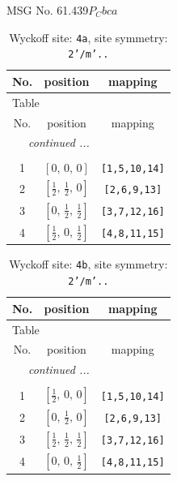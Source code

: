 \documentclass[fleqn,8pt]{jsarticle}
\begin{document}
\setcounter{MaxMatrixCols}{32}

\renewcommand{\tablename}{Table~}
\renewcommand{\figurename}{Figure~}
\begin{center}
\LARGE
MSG No. 61.439\quad$P_{C}bca$
\end{center}
\renewcommand{\arraystretch}{1.2}
\begin{longtable}{ccc}
\caption{Wyckoff site: {\tt 4a}, site symmetry: {\tt 2'/m'..}}
 \\
 \hline \hline
No. & position & mapping \\ \hline \endfirsthead

\multicolumn{2}{l}{\tablename\ \thetable{}} \\
 \hline \hline
No. & position & mapping \\ \hline \endhead

 \hline \hline
\multicolumn{2}{r}{\footnotesize\it continued ...} \\ \endfoot

 \hline \hline
\multicolumn{2}{r}{} \\ \endlastfoot

1 & $\left[ 0,\, 0,\, 0 \right]$ & {\tt [1,5,10,14]} \\ \hline
2 & $\left[ \frac{1}{2},\, \frac{1}{2},\, 0 \right]$ & {\tt [2,6,9,13]} \\ \hline
3 & $\left[ 0,\, \frac{1}{2},\, \frac{1}{2} \right]$ & {\tt [3,7,12,16]} \\ \hline
4 & $\left[ \frac{1}{2},\, 0,\, \frac{1}{2} \right]$ & {\tt [4,8,11,15]} \\
\end{longtable}
\renewcommand{\arraystretch}{1.2}
\begin{longtable}{ccc}
\caption{Wyckoff site: {\tt 4b}, site symmetry: {\tt 2'/m'..}}
 \\
 \hline \hline
No. & position & mapping \\ \hline \endfirsthead

\multicolumn{2}{l}{\tablename\ \thetable{}} \\
 \hline \hline
No. & position & mapping \\ \hline \endhead

 \hline \hline
\multicolumn{2}{r}{\footnotesize\it continued ...} \\ \endfoot

 \hline \hline
\multicolumn{2}{r}{} \\ \endlastfoot

1 & $\left[ \frac{1}{2},\, 0,\, 0 \right]$ & {\tt [1,5,10,14]} \\ \hline
2 & $\left[ 0,\, \frac{1}{2},\, 0 \right]$ & {\tt [2,6,9,13]} \\ \hline
3 & $\left[ \frac{1}{2},\, \frac{1}{2},\, \frac{1}{2} \right]$ & {\tt [3,7,12,16]} \\ \hline
4 & $\left[ 0,\, 0,\, \frac{1}{2} \right]$ & {\tt [4,8,11,15]} \\
\end{longtable}
\end{document}
